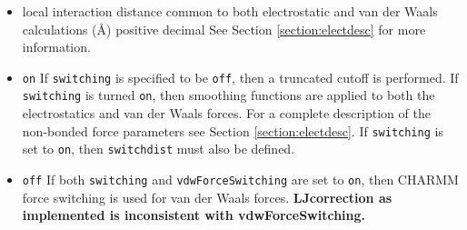 \begin{itemize}


\item
{}
{local interaction distance common to both electrostatic 
and van der Waals calculations (\AA)}
{positive decimal}
{%
See Section \ref{section:electdesc} for more information.}

\item
{}
{{\tt on}}
{If {\tt switching} is
specified to be {\tt off}, then a truncated cutoff is performed.
If {\tt switching} is turned {\tt on}, then smoothing functions
are applied to both the electrostatics and van der Waals forces.
For a complete description of the non-bonded force parameters see
Section \ref{section:electdesc}.  If {\tt switching} is set to
{\tt on}, then {\tt switchdist} must also be defined.}

\item
{}
{{\tt off}}
{If both {\tt switching} and {\tt vdwForceSwitching} are set to {\tt on},
then CHARMM force switching is used for van der Waals forces.
{\bf LJcorrection as implemented is inconsistent with vdwForceSwitching.}}


\end{itemize}
